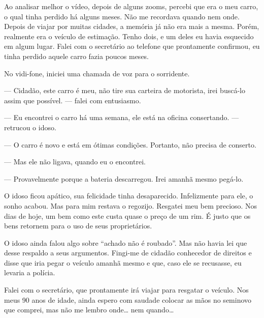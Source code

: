 \documentclass[a4paper,14pt]{book}
\begin{document}
Ao analisar melhor o vídeo, depois de alguns zooms, percebi que era o meu carro, o qual tinha perdido há alguns meses. Não me recordava quando nem onde. Depois de viajar por muitas cidades, a memória já não era mais a mesma. Porém, realmente era o veículo de estimação. Tenho dois, e um deles eu havia esquecido em algum lugar. Falei com o secretário ao telefone que prontamente confirmou, eu tinha perdido aquele carro fazia poucos meses.

No vidi-fone, iniciei uma chamada de voz para o sorridente.

— Cidadão, este carro é meu, não tire sua carteira de motorista, irei buscá-lo assim que possível. — falei com entusiasmo.

— Eu encontrei o carro há uma semana, ele está na oficina consertando. — retrucou o idoso.

— O carro é novo e está em ótimas condições. Portanto, não precisa de conserto.

— Mas ele não ligava, quando eu o encontrei.

— Provavelmente porque a bateria descarregou. Irei amanhã mesmo pegá-lo.

O idoso ficou apático, sua felicidade tinha desaparecido. Infelizmente para ele, o sonho acabou. Mas para mim restava o regozijo. Resgatei meu bem precioso. Nos dias de hoje, um bem como este custa quase o preço de um rim. É justo que os bens retornem para o uso de seus proprietários.

O idoso ainda falou algo sobre “achado não é roubado”. Mas não havia lei que desse respaldo a seus argumentos. Fingi-me de cidadão conhecedor de direitos e disse que iria pegar o veículo amanhã mesmo e que, caso ele se recusasse, eu levaria a polícia.

Falei com o secretário, que prontamente irá viajar para resgatar o veículo. Nos meus 90 anos de idade, ainda espero com saudade colocar as mãos no seminovo que comprei, mas não me lembro onde… nem quando…
\end{document}
